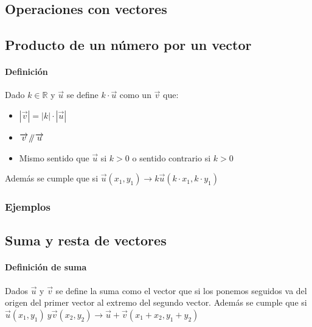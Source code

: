 \documentclass[a4paper,spanish,9pt]{extarticle}
\newcommand{\samedir}{\mathbin{\!/\mkern-5mu/\!}}
\begin{document}
\begin{multicols*}{2}
\section{Operaciones con vectores}
\subsection{Producto de un número por un vector}
\paragraph*{Definición}
Dado $k \in \mathbb{R}$ y $\overrightarrow{u}$ se define $k\cdot\overrightarrow{u}$ como un $\overrightarrow{v}$ que:\begin{itemize}
\item $\left|\overrightarrow{v}\right|=\left|k\right|\cdot\left|\overrightarrow{u}\right|$
\item $ \overrightarrow{v}\samedir\overrightarrow{u}$
\item Mismo sentido que $\overrightarrow{u}$ si $k>0$ o sentido contrario si $k>0$
\end{itemize}Además se cumple que si $\overrightarrow{u}(x_1,y_1)\to k\overrightarrow{u}(k\cdot x_1,k\cdot y_1)$

\subsubsection{Ejemplos}

\subsection{Suma y resta de vectores}
\paragraph*{Definición de suma} Dados $\overrightarrow{u}$ y $\overrightarrow{v}$ se define la suma como el vector que   si los ponemos seguidos va del origen del primer vector al extremo del segundo vector. Además se cumple que si $\overrightarrow{u}(x_1,y_1) \ y \overrightarrow{v}(x_2,y_2) \to \overrightarrow{u} +\overrightarrow{v}(x_1+x_2, y_1+y_2)$ 
\medskip 


\end{multicols*}
\end{document}
